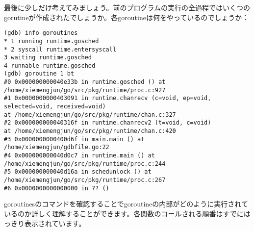 最後に少しだけ考えてみましょう。前のプログラムの実行の全過程ではいくつのgorutineが作成されたでしょうか。各goroutineは何をやっているのでしょうか：



\begin{lstlisting}[numbers=none]
(gdb) info goroutines
* 1 running runtime.gosched
* 2 syscall runtime.entersyscall 
3 waiting runtime.gosched 
4 runnable runtime.gosched
(gdb) goroutine 1 bt
#0 0x000000000040e33b in runtime.gosched () at /home/xiemengjun/go/src/pkg/runtime/proc.c:927
#1 0x0000000000403091 in runtime.chanrecv (c=void, ep=void, selected=void, received=void)
at /home/xiemengjun/go/src/pkg/runtime/chan.c:327
#2 0x000000000040316f in runtime.chanrecv2 (t=void, c=void)
at /home/xiemengjun/go/src/pkg/runtime/chan.c:420
#3 0x0000000000400d6f in main.main () at /home/xiemengjun/gdbfile.go:22
#4 0x000000000040d0c7 in runtime.main () at /home/xiemengjun/go/src/pkg/runtime/proc.c:244
#5 0x000000000040d16a in schedunlock () at /home/xiemengjun/go/src/pkg/runtime/proc.c:267
#6 0x0000000000000000 in ?? ()
\end{lstlisting}

goroutinesのコマンドを確認することでgoroutineの内部がどのように実行されているのか詳しく理解することができます。各関数のコールされる順番はすでにはっきり表示されています。



